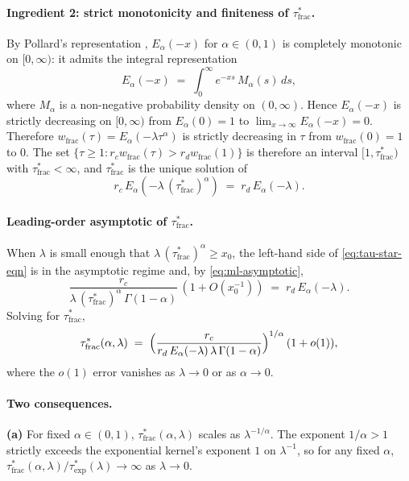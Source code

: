 \documentclass[11pt]{article}
\theoremstyle{plain}
\theoremstyle{definition}
\begin{document}
\paragraph{Ingredient 2: strict monotonicity and
finiteness of \boldmath$\tau^*_{\mathrm{frac}}$\unboldmath.}
By Pollard's representation \cite{pollard1948ml},
$E_\alpha(-x)$ for $\alpha \in (0,1)$ is completely
monotonic on $[0, \infty)$: it admits the integral
representation
\[
E_\alpha(-x) \;=\; \int_0^\infty e^{-xs}\,
M_\alpha(s)\,ds,
\]
where $M_\alpha$ is a non-negative probability
density on $(0, \infty)$.  Hence $E_\alpha(-x)$ is
strictly decreasing on $[0, \infty)$ from $E_\alpha(0)
= 1$ to $\lim_{x \to \infty} E_\alpha(-x) = 0$.
Therefore $w_{\mathrm{frac}}(\tau) = E_\alpha(
-\lambda \tau^\alpha)$ is strictly decreasing in
$\tau$ from $w_{\mathrm{frac}}(0) = 1$ to $0$.  The
set $\{\tau \geq 1 : r_c w_{\mathrm{frac}}(\tau) >
r_d w_{\mathrm{frac}}(1)\}$ is therefore an interval
$[1, \tau^*_{\mathrm{frac}})$ with $\tau^*_{\mathrm{frac}}
< \infty$, and $\tau^*_{\mathrm{frac}}$ is the unique
solution of
\begin{equation}\label{eq:tau-star-eqn}
r_c\,E_\alpha(-\lambda\,(\tau^*_{\mathrm{frac}})^\alpha)
\;=\; r_d\,E_\alpha(-\lambda).
\end{equation}

\paragraph{Leading-order asymptotic of
\boldmath$\tau^*_{\mathrm{frac}}$\unboldmath.}  When
$\lambda$ is small enough that $\lambda\,
(\tau^*_{\mathrm{frac}})^\alpha \geq x_0$, the
left-hand side of \eqref{eq:tau-star-eqn} is in the
asymptotic regime and, by \eqref{eq:ml-asymptotic},
\[
\frac{r_c}{\lambda\,(\tau^*_{\mathrm{frac}})^\alpha\,
  \Gamma(1-\alpha)}\,(1 + O(x_0^{-1}))
\;=\; r_d\,E_\alpha(-\lambda).
\]
Solving for $\tau^*_{\mathrm{frac}}$,
\begin{equation}\label{eq:tau-star-frac}
\tau^*_{\mathrm{frac}}(\alpha, \lambda)
\;=\; \Bigl(\frac{r_c}
  {r_d\,E_\alpha(-\lambda)\,\lambda\,
   \Gamma(1-\alpha)}\Bigr)^{1/\alpha}
\,(1 + o(1)),
\end{equation}
where the $o(1)$ error vanishes as $\lambda \to 0$
or as $\alpha \to 0$.

\paragraph{Two consequences.}
\textbf{(a)}  For fixed $\alpha \in (0,1)$,
$\tau^*_{\mathrm{frac}}(\alpha, \lambda)$ scales as
$\lambda^{-1/\alpha}$.  The exponent $1/\alpha > 1$
strictly exceeds the exponential kernel's exponent
$1$ on $\lambda^{-1}$, so for any fixed $\alpha$,
$\tau^*_{\mathrm{frac}}(\alpha, \lambda) /
\tau^*_{\mathrm{exp}}(\lambda) \to \infty$ as
$\lambda \to 0$.
\end{document}
